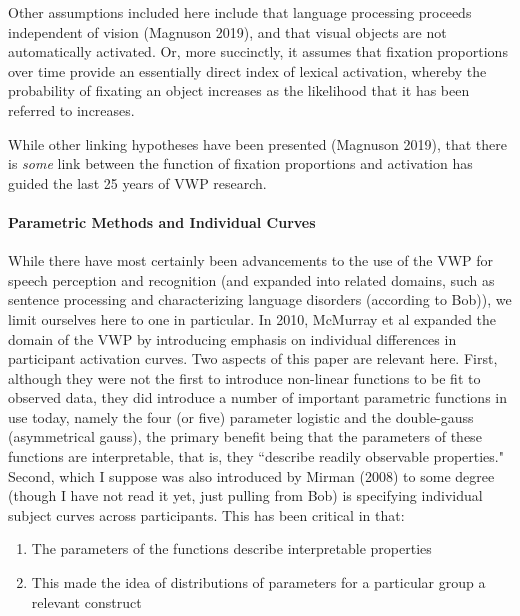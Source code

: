 \documentclass{article}
\begin{document}
Other assumptions included here include that language processing proceeds independent of vision (Magnuson 2019), and that visual objects are not automatically activated. Or, more succinctly, it assumes that fixation proportions over time provide an essentially direct index of lexical activation, whereby the probability of fixating an object increases as the likelihood that it has been referred to increases.


While other linking hypotheses have been presented (Magnuson 2019), that there is \textit{some} link between the function of fixation proportions and activation has guided the last 25 years of VWP research.



\paragraph{Parametric Methods and Individual Curves} While there have most certainly been advancements to the use of the VWP for speech perception and recognition (and expanded into related domains, such as sentence processing and characterizing language disorders (according to Bob)), we  limit ourselves here to one in particular. In 2010, McMurray et al expanded the domain of the VWP by introducing emphasis on individual differences in participant activation curves. Two aspects of this paper are relevant here. First, although they were not the first to introduce non-linear functions to be fit to observed data, they did introduce a number of important parametric functions in use today, namely the four (or five) parameter logistic and the double-gauss (asymmetrical gauss), the primary benefit being that the parameters of these functions are interpretable, that is, they ``describe readily observable properties." Second, which I suppose was also introduced by Mirman (2008) to some degree (though I have not read it yet, just pulling from Bob) is specifying individual subject curves across participants. This has been critical in that:

\begin{singlespace}
\begin{enumerate}
\vspace{-3mm}
\item The parameters of the functions describe interpretable properties
\item This made the idea of distributions of parameters for a particular group a relevant construct
\end{enumerate}
\end{singlespace}
\end{document}
